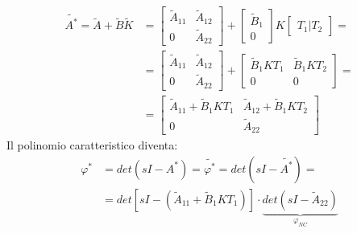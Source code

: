 \documentclass[../main.tex]{subfiles}
\begin{document}
		\begin{align*}
			\tilde{A^{*}} = \tilde A + \tilde B \tilde K &=
			\begin{bmatrix}
				\tilde A_{11} & \tilde A_{12}\\
				0 & \tilde A_{22}
			\end{bmatrix} +
			\begin{bmatrix}
				\tilde B_{1}\\
				0
			\end{bmatrix} K
			\begin{bmatrix}
				T_1 | T_2
			\end{bmatrix}=
			\\
			&= \begin{bmatrix}
				\tilde A_{11} & \tilde A_{12}\\
				0 & \tilde A_{22}
			\end{bmatrix} +
			\begin{bmatrix}
				\tilde B_1 K T_1 & \tilde B_1 K T_2\\
				0 & 0
			\end{bmatrix}=
			\\
			&= \begin{bmatrix}
				\tilde A_{11} + \tilde B_1 K T_1 & \tilde A_{12} + \tilde B_1 K T_2\\
				0 & \tilde A_{22}
			\end{bmatrix}
		\end{align*}
		Il polinomio caratteristico diventa:
		\begin{align*}
			\varphi^{*} &= det(sI-A^{*}) = \tilde{\varphi^{*}} = det(sI-\tilde{A^{*}}) =\\
			&= det\left[ sI - (\tilde A_{11} + \tilde B_1 K T_1) \right] \cdot \underbrace{det(sI - \tilde A_{22})}_{\varphi_{NC}}
		\end{align*}
		
\end{document}
